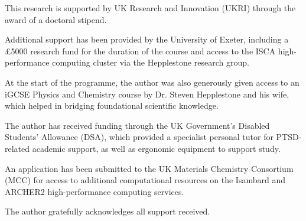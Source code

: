 This research is supported by UK Research and Innovation (UKRI) through the award of a doctoral stipend.

Additional support has been provided by the University of Exeter, including a £5000 research fund for the duration of the course and access to the ISCA high-performance computing cluster via the Hepplestone research group.

At the start of the programme, the author was also generously given access to an iGCSE Physics and Chemistry course by Dr. Steven Hepplestone and his wife, which helped in bridging foundational scientific knowledge.

The author has received funding through the UK Government’s Disabled Students’ Allowance (DSA), which provided a specialist personal tutor for PTSD-related academic support, as well as ergonomic equipment to support study.

An application has been submitted to the UK Materials Chemistry Consortium (MCC) for access to additional computational resources on the Isambard and ARCHER2 high-performance computing services.

The author gratefully acknowledges all support received.